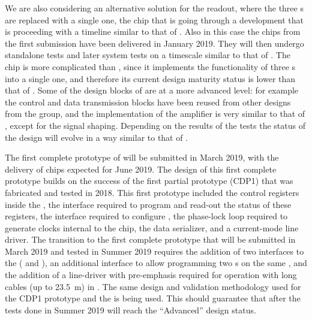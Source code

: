 We are also considering an alternative solution for the readout, where
the three s are replaced with a single one, the 
chip that is going through a development that is proceeding with a 
timeline similar to that of . Also in this case the
chips from the first submission have been delivered in January 2019.
They will then undergo standalone tests
and later system tests on a timescale similar to that of .
The  chip is more complicated than ,
since it implements the functionality of three s into a
single one, and therefore its current design maturity status is
lower than that of . Some of the design blocks of
 are at a more advanced level: for example the control
and data transmission blocks have been reused from other 
designs from the  group, and the implementation of the  amplifier
is very similar to that of , except for the signal 
shaping. Depending on the results of the tests the status of the
 design will evolve in a way similar to that of .

The first complete prototype of  will be submitted in 
March 2019, with the delivery of chips expected for June 2019.
The design of this first complete prototype builds on the success of
the first partial prototype (CDP1) that was fabricated and tested in 2018.
This first prototype included the control registers inside the 
, the  interface required to program and read-out
the status of these registers, the  interface required to
configure , the phase-lock loop required to generate
clocks internal to the chip, the data serializer, and a current-mode
line driver. The transition to the first complete prototype that
will be submitted in March 2019 and tested in Summer 2019
requires the addition of two interfaces to the  (
and ), an additional  interface to allow programming two
 s on the same , and the
addition of a line-driver with pre-emphasis required for operation
with long cables (up to \SI{23.5}{m}) in \lar. The same design and
validation methodology used for the CDP1 prototype and the 
is being used. This should guarantee that after the tests done in
Summer 2019  will reach the ``Advanced'' design 
status. 

